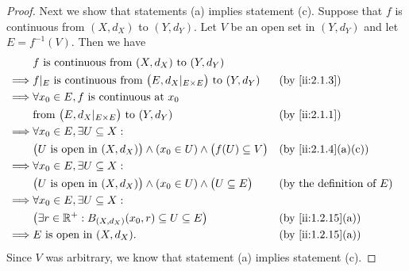 \begin{proof}
  Next we show that statements (a) implies statement (c).
  Suppose that \(f\) is continuous from \((X, d_X)\) to \((Y, d_Y)\).
  Let \(V\) be an open set in \((Y, d_Y)\) and let \(E = f^{-1}(V)\).
  Then we have
  \begin{align*}
             & f \text{ is continuous from } (X, d_X) \text{ to } (Y, d_Y)                                                                          \\
    \implies & f|_{E} \text{ is continuous from } \big(E, d_X|_{E \times E}\big) \text{ to } (Y, d_Y)      &  & \by{ii:2.1.3}                       \\
    \implies & \forall x_0 \in E, f \text{ is continuous at } x_0                                                                                   \\
             & \text{from } \big(E, d_X|_{E \times E}\big) \text{ to } (Y, d_Y)                            &  & \by{ii:2.1.1}                       \\
    \implies & \forall x_0 \in E, \exists U \subseteq X :                                                                                           \\
             & \big(U \text{ is open in } (X, d_X)\big) \land (x_0 \in U) \land \big(f(U) \subseteq V\big) &  & \by{ii:2.1.4}[a,c]                  \\
    \implies & \forall x_0 \in E, \exists U \subseteq X :                                                                                           \\
             & \big(U \text{ is open in } (X, d_X)\big) \land (x_0 \in U) \land \big(U \subseteq E\big)    &  & \text{(by the definition of \(E\))} \\
    \implies & \forall x_0 \in E, \exists U \subseteq X :                                                                                           \\
             & \big(\exists r \in \R^+ : B_{(X, d_X)}(x_0, r) \subseteq U \subseteq E\big)                 &  & \by{ii:1.2.15}[a]                   \\
    \implies & E \text{ is open in } (X, d_X).                                                             &  & \by{ii:1.2.15}[a]
  \end{align*}
  Since \(V\) was arbitrary, we know that statement (a) implies statement (c).


\end{proof}

